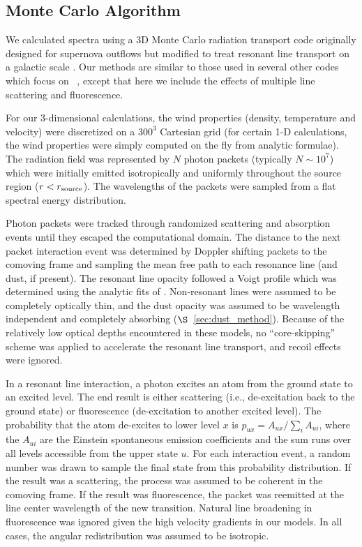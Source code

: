 \documentclass[]{emulateapj}
\begin{document}
\subsection{Monte Carlo Algorithm}
\label{sec:monte}


We calculated spectra using a 3D Monte Carlo radiation transport code
originally designed for supernova outflows  \citep{Kasen_2006} but
modified to treat resonant line transport  on a galactic scale
\citep{Kasen_lyman}.  Our methods are similar to those used in several
other codes which focus on \lya\
\citep[e.g.,][]{Zheng_2002,Dijkstra_2006,Verhame_2006,Laursen_2009},
except that here we include the effects of multiple line scattering
and fluorescence. 

For our 3-dimensional calculations, the  wind properties (density, temperature and velocity) were discretized on a $300^3$ Cartesian grid (for certain 1-D calculations, the wind properties were simply computed on the fly from analytic formulae).   
The radiation field was represented by $N$ photon packets (typically $N \sim 10^7$) which were initially emitted isotropically and uniformly throughout the source region ($r < r_{\rm source}$).  The wavelengths of the packets were sampled from a flat spectral energy distribution. 

Photon packets were tracked through randomized scattering and
absorption events until they escaped the computational domain.  The
distance to the next packet interaction event was determined by
Doppler shifting packets to the comoving frame and sampling the mean
free path to each resonance line (and dust, if present).  The resonant
line opacity followed a Voigt profile which was determined using the
analytic fits of  \cite{Tomi_2006}.      Non-resonant lines were
assumed to be completely optically thin, and the dust opacity was
assumed to be wavelength independent and completely absorbing
($\S$~\ref{sec:dust_method}).
Because of the relatively low optical depths encountered in
these models, no ``core-skipping'' scheme was applied to accelerate
the resonant line transport,  and recoil effects were ignored. 

In a resonant line interaction, a photon excites an atom from the
ground state to an excited level.  The end result is either scattering
(i.e., de-excitation back to the ground state) or fluorescence
(de-excitation to another excited  level).  The probability that the
atom de-excites to lower level $x$ is  $p_{ux} = A_{ux} / \sum_i A_{ui}$, where the $A_{ui}$ are the Einstein spontaneous emission coefficients and the sum runs over all levels accessible from the upper state $u$.  
For each interaction event, a random number was drawn to sample the
final state from this probability distribution.    If the result was a
scattering, the process was assumed to be coherent in the comoving
frame.  If the result was fluorescence, the packet was  reemitted at
the line center wavelength of the new transition.  Natural line
broadening in fluorescence was ignored given the high velocity
gradients in our models.  In all cases, the angular redistribution was
assumed to be isotropic. 
\end{document}
